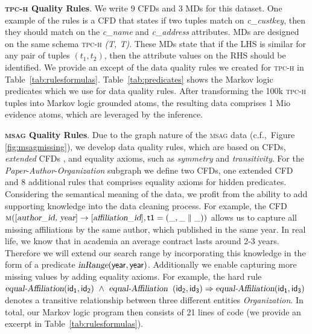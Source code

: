 \textbf{\textsc{tpc-h} Quality Rules}. We write 9 CFDs and 3 MDs for this dataset. One example of the rules is a CFD that states if two tuples match on \textsl{c\_custkey}, then they should match on the \textsl{c\_name} and \textsl{c\_address} attributes. MDs are designed on the same schema \textsc{tpc-h} \textsl{(T, T)}. These MDs state that if the LHS is similar for any pair of tuples $(t_1,t_2)$, then the attribute values on the RHS should be identified. We provide an except of the data quality rules we created for \textsc{tpc-h} in Table~\ref{tab:rulesformulas}. Table~\ref{tab:predicates} shows the Markov logic predicates which we use for data quality rules. After transforming the 100k \textsc{tpc-h} tuples into Markov logic grounded atoms, the resulting data comprises 1 Mio evidence atoms, which are leveraged by the inference. 

\textbf{\textsc{msag} Quality Rules}. Due to the graph nature of the \textsc{msag} data (c.f.,~Figure \ref{fig:msagmissing}), we develop data quality rules, which are based on CFDs, \textit{extended} CFDs \cite{Chen2009extended}, and equality axioms, such as \textit{symmetry} and \textit{transitivity}. For the \textit{Paper}-\textit{Author}-\textit{Organization} subgraph we define two CFDs, one extended CFD and 8 additional rules that comprises equality axioms for hidden predicates. Considering the semantical meaning of the data, we profit from the ability to add supporting knowledge into the data cleaning process. For example, the CFD $\mathsf{\textsc{m}([\textsl{author\_id, year}] \rightarrow [\textsl{affiliation\_id}],t1=(\_,\_ \parallel \_))} $ allows us to capture all missing affiliations by the same author, which published in the same year. In real life, we know that in academia an average contract lasts around 2-3 years. Therefore we will extend our search range by incorporating this knowledge in the form of a predicate $\mathsf{\textsl{inRange}(year, year)}$. Additionally we enable capturing more missing values by adding equality axioms. For example, the hard rule $\mathsf{\textsl{equal-Affiliation}(id_1, id_2) ~\wedge~ \textsl{equal-Affiliation}}$ $\mathsf{(id_2, id_3) \Rightarrow  \textsl{equal-Affiliation}(id_1, id_3)}$ denotes a transitive relationship between three different entities \textit{Organization}. In total, our Markov logic program then consists of 21 lines of code (we provide an excerpt in Table~\ref{tab:rulesformulas}). 

